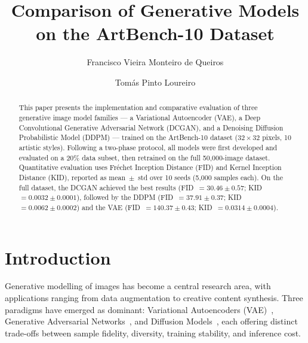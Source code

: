 \documentclass{llncs}
\begin{document}
\title{Comparison of Generative Models\texorpdfstring{\\}{ }on the ArtBench-10 Dataset}

\author{Francisco Vieira Monteiro de Queiros \and
        Tomás Pinto Loureiro}



\maketitle

\begin{abstract}
This paper presents the implementation and comparative evaluation of three
generative image model families --- a Variational Autoencoder (VAE), a Deep
Convolutional Generative Adversarial Network (DCGAN), and a Denoising
Diffusion Probabilistic Model (DDPM) --- trained on the ArtBench-10 dataset
($32\times32$ pixels, 10 artistic styles). Following a two-phase protocol,
all models were first developed and evaluated on a 20\% data subset, then
retrained on the full 50,000-image dataset. Quantitative evaluation uses
Fr\'echet Inception Distance (FID) and Kernel Inception Distance (KID),
reported as mean~$\pm$~std over 10 seeds (5,000 samples each). On the full
dataset, the DCGAN achieved the best results
(FID~$=30.46\pm0.57$; KID~$=0.0032\pm0.0001$), followed by the DDPM
(FID~$=37.91\pm0.37$; KID~$=0.0062\pm0.0002$) and the VAE
(FID~$=140.37\pm0.43$; KID~$=0.0314\pm0.0004$).

\end{abstract}

\section{Introduction}

Generative modelling of images has become a central research area, with
applications ranging from data augmentation to creative content synthesis.
Three paradigms have emerged as dominant: Variational Autoencoders
(VAE)~\cite{kingma2013}, Generative Adversarial Networks~\cite{radford2015},
and Diffusion Models~\cite{ho2020}, each offering distinct trade-offs between
sample fidelity, diversity, training stability, and inference cost.
\end{document}
